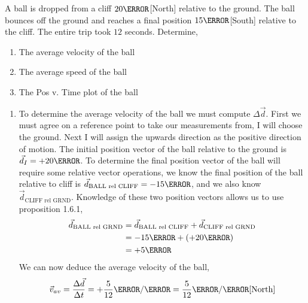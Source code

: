 \documentclass[12pt]{article} %
\newcommand{\tx}[1]{\text{#1}}
\begin{document}
\begin{qstn}[4]
\begin{soln}
    \end{soln}



\end{qstn}


\begin{qstn}[5]
A ball is dropped from a cliff $20\m$[North] relative to the ground. The ball bounces off the ground and reaches a final position $15\m$[South] relative to the cliff. The entire trip took $12$ seconds. Determine,
\begin{enumerate}[label = (\alph*)]
    \item The average velocity of the ball
    \item The average speed of the ball
    \item The Pos v. Time plot of the ball
\end{enumerate}

\begin{soln}
    \begin{enumerate}[label = (\alph*)]
        \item To determine the average velocity of the ball we must compute $\Delta \vec d$. First we must agree on a reference point to take our measurements from, I will choose the ground. Next I will assign the upwards direction as the positive direction of motion. The initial position vector of the ball relative to the ground is $\vec d_I = +20\m$. To determine the final position vector of the ball will require some relative vector operations, we know the final position of the ball relative to cliff is $\vec d_{\tx{BALL rel CLIFF}} = -15\m$, and we also know $\vec d_{\tx{CLIFF rel GRND}}$. Knowledge of these two position vectors allows us to use proposition 1.6.1, 
        \begin{align*}
            \vec d_{\tx{BALL rel GRND}} &= \vec d_{\tx{BALL rel CLIFF}} + \vec d_{\tx{CLIFF rel GRND}}\\
            &= -15\m + (+20\m)\\
            &= +5\m\\
        \end{align*}
        We can now deduce the average velocity of the ball,
            $$\vec v_{av} = \frac{\Delta \vec d}{\Delta t} = +\frac{5}{12} \m / \s = \frac{5}{12} \m / \s \tx{[North]}$$
            

\end{enumerate}
\end{soln}
\end{qstn}
\end{document}
